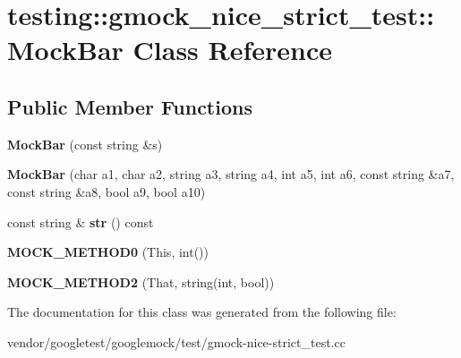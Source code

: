 \hypertarget{classtesting_1_1gmock__nice__strict__test_1_1_mock_bar}{}\section{testing\+:\+:gmock\+\_\+nice\+\_\+strict\+\_\+test\+:\+:Mock\+Bar Class Reference}
\label{classtesting_1_1gmock__nice__strict__test_1_1_mock_bar}
\subsection*{Public Member Functions}
\begin{DoxyCompactItemize}
\item 
\mbox{\label{classtesting_1_1gmock__nice__strict__test_1_1_mock_bar_a3b271f736d0b519777af26e7ac76d442}} 
{\bfseries Mock\+Bar} (const string \&s)
\item 
\mbox{\label{classtesting_1_1gmock__nice__strict__test_1_1_mock_bar_a2f30bd760cd5b5a8de72d081b26df5b9}} 
{\bfseries Mock\+Bar} (char a1, char a2, string a3, string a4, int a5, int a6, const string \&a7, const string \&a8, bool a9, bool a10)
\item 
\mbox{\label{classtesting_1_1gmock__nice__strict__test_1_1_mock_bar_a417755a41cb5a75dec7f98bdd951185c}} 
const string \& {\bfseries str} () const
\item 
\mbox{\label{classtesting_1_1gmock__nice__strict__test_1_1_mock_bar_a9aad688c2b1dc6b529b7c499e49e3a70}} 
{\bfseries M\+O\+C\+K\+\_\+\+M\+E\+T\+H\+O\+D0} (This, int())
\item 
\mbox{\label{classtesting_1_1gmock__nice__strict__test_1_1_mock_bar_ac2c649c788feae66d3b4a9249720ae5b}} 
{\bfseries M\+O\+C\+K\+\_\+\+M\+E\+T\+H\+O\+D2} (That, string(int, bool))
\end{DoxyCompactItemize}


The documentation for this class was generated from the following file\+:\begin{DoxyCompactItemize}
\item 
vendor/googletest/googlemock/test/gmock-\/nice-\/strict\+\_\+test.\+cc\end{DoxyCompactItemize}
